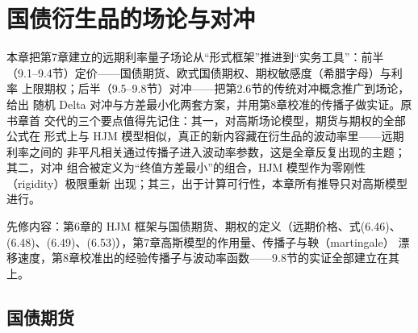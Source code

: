 \chapter{国债衍生品的场论与对冲}

本章把第7章建立的远期利率量子场论从“形式框架”推进到“实务工具”：前半
（9.1--9.4节）定价——国债期货、欧式国债期权、期权敏感度（希腊字母）与利率
上限期权；后半（9.5--9.8节）对冲——把第2.6节的传统对冲概念推广到场论，给出
随机 Delta 对冲与方差最小化两套方案，并用第8章校准的传播子做实证。原书章首
交代的三个要点值得先记住：其一，对高斯场论模型，期货与期权的全部公式在
形式上与 HJM 模型相似，真正的新内容藏在衍生品的波动率里——远期利率之间的
非平凡相关通过传播子进入波动率参数，这是全章反复出现的主题；其二，对冲
组合被定义为“终值方差最小”的组合，HJM 模型作为零刚性（rigidity）极限重新
出现；其三，出于计算可行性，本章所有推导只对高斯模型进行。

先修内容：第6章的 HJM 框架与国债期货、期权的定义（远期价格、式(6.46)、
(6.48)、(6.49)、(6.53)），第7章高斯模型的作用量、传播子与鞅（martingale）
漂移速度，第8章校准出的经验传播子与波动率函数——9.8节的实证全部建立在其上。

\section{国债期货}

